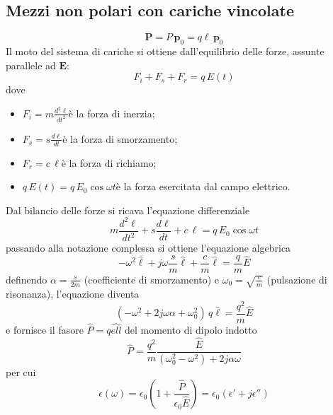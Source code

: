 \documentclass[a4paper]{article}
\begin{document}
\subsection*{Mezzi non polari con cariche vincolate}
\begin{equation*}
\textbf{P}=P\,\textbf{p}_0=q\ell\,\textbf{p}_0
\end{equation*}
Il moto del sistema di cariche si ottiene dall'equilibrio delle forze, assunte parallele ad $\textbf{E}$:
\begin{equation*}
F_i+F_s+F_r=q\,E(t)
\end{equation*}
dove
\begin{itemize}
\item $F_i = m\frac{d^2\ell}{dt^2}$\hspace{29mm}è la forza di inerzia;
\item $F_s=s\frac{d\ell}{dt}$\hspace{31mm}è la forza di smorzamento;
\item $F_r=c\,\ell$\hspace{33mm}è la forza di richiamo;
\item $q\,E(t)=q\,E_0\cos\omega t$\hspace{15mm}è la forza esercitata dal campo elettrico.
\end{itemize}
Dal bilancio delle forze si ricava l'equazione differenziale
\begin{equation*}
m\frac{d^2\ell}{dt^2}+s\frac{d\ell}{dt}+c\,\ell=q\,E_0\cos\omega t
\end{equation*}
passando alla notazione complessa si ottiene l'equazione algebrica
\begin{equation*}
-\omega^2\hat{\ell}+j\omega\frac{s}{m}\hat{\ell}+\frac{c}{m}\hat{\ell}=\frac{q}{m}\hat{E}
\end{equation*}
definendo $\alpha=\frac{s}{2m}$ (coefficiente di smorzamento) e $\omega_0=\sqrt{\frac{c}{m}}$ (pulsazione di risonanza), l'equazione diventa
\begin{equation*}
(-\omega^2+2j\omega\alpha+\omega_0^2)\,q\hat{\ell}=\frac{q^2}{m}\hat{E}
\end{equation*}
e fornisce il fasore $\hat{P}=q\hat{ell}$ del momento di dipolo indotto
\begin{equation*}
\hat{P}=\frac{q^2}{m}\frac{\hat{E}}{(\omega_0^2-\omega^2)+2j\alpha\omega}
\end{equation*}
per cui
\begin{equation*}
\epsilon(\omega)=\epsilon_0(1+\frac{\hat{P}}{\epsilon_0\hat{E}})=\epsilon_0(\epsilon'+j\epsilon'')
\end{equation*}
\end{document}

